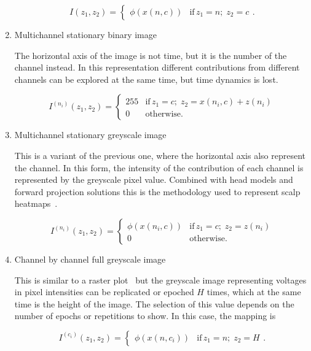 \begin{enumerate}
\begin{equation}
I(z_1,z_2) = \left\{ \begin{array}{rl} \phi(x(n,c))  & \text{if} \,  z_1 = n; \; z_2 = c \end{array}\right. .
\label{eq:image3}
\end{equation}


\item Multichannel stationary binary image

The horizontal axis of the image is not time, but it is the number of the channel instead.   In this representation different contributions from different channels can be explored at the same time, but time dynamics is lost.  

\begin{equation}
I^{(n_i)}(z_1,z_2) = \left\{ \begin{array}{rl}
255 & \text{if} \,  z_1 = c; \; z_2 =  x(n_i,c) + z(n_i) \\
0   & \mbox{otherwise}.
\end{array}\right.
\label{eq:image4}
\end{equation}

\item Multichannel stationary greyscale image

This is a variant of the previous one, where the horizontal axis also represent the channel.   In this form, the intensity of the contribution of each channel is represented by the greyscale pixel value.  Combined with head models and forward projection solutions this is the methodology used to represent scalp heatmaps~\cite{Gramfort2013}.

\begin{equation}
I^{(n_i)}(z_1,z_2)= \left\{ \begin{array}{rl}
\phi(x(n_i,c)) & \text{if} \,  z_1 = c; \; z_2 =  z(n_i) \\
0   & \mbox{otherwise}.
\end{array}\right.
\label{eq:image5}
\end{equation}


\item Channel by channel full greyscale image

This is similar to a raster plot~\cite{Cohen2014} but the greyscale image representing voltages in pixel intensities can be replicated or epoched $H$ times, which at the same time is the height of the image.  The selection of this value depends on the number of epochs or repetitions to show.  In this case, the mapping is

\begin{equation}
I^{(c_i)}(z_1,z_2) = \left\{ \begin{array}{rl} \phi(x(n,c_i))  & \text{if} \,  z_1 = n; \; z_2 = H \end{array}\right. .
\label{eq:image6}
\end{equation}


\end{enumerate}


